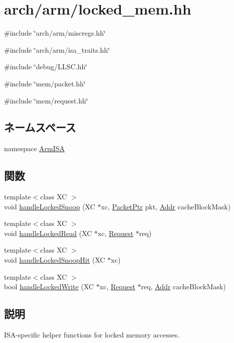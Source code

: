 \hypertarget{arm_2locked__mem_8hh}{
\section{arch/arm/locked\_\-mem.hh}
\label{arm_2locked__mem_8hh}
}
{\ttfamily \#include \char`\"{}arch/arm/miscregs.hh\char`\"{}}\par
{\ttfamily \#include \char`\"{}arch/arm/isa\_\-traits.hh\char`\"{}}\par
{\ttfamily \#include \char`\"{}debug/LLSC.hh\char`\"{}}\par
{\ttfamily \#include \char`\"{}mem/packet.hh\char`\"{}}\par
{\ttfamily \#include \char`\"{}mem/request.hh\char`\"{}}\par
\subsection*{ネームスペース}
\begin{DoxyCompactItemize}
\item 
namespace \hyperlink{namespaceArmISA}{ArmISA}
\end{DoxyCompactItemize}
\subsection*{関数}
\begin{DoxyCompactItemize}
\item 
{\footnotesize template$<$class XC $>$ }\\void \hyperlink{namespaceArmISA_a8ff51dd8329a9d73fa3f696ba2459b53}{handleLockedSnoop} (XC $\ast$xc, \hyperlink{classPacket}{PacketPtr} pkt, \hyperlink{classm5_1_1params_1_1Addr}{Addr} cacheBlockMask)
\item 
{\footnotesize template$<$class XC $>$ }\\void \hyperlink{namespaceArmISA_a366732c079bc222778d2dd75d28e0c37}{handleLockedRead} (XC $\ast$xc, \hyperlink{classRequest}{Request} $\ast$req)
\item 
{\footnotesize template$<$class XC $>$ }\\void \hyperlink{namespaceArmISA_a87d0d22ac86177c45484fa875900fa32}{handleLockedSnoopHit} (XC $\ast$xc)
\item 
{\footnotesize template$<$class XC $>$ }\\bool \hyperlink{namespaceArmISA_aca61775d408552ba4837ee45f484dd39}{handleLockedWrite} (XC $\ast$xc, \hyperlink{classRequest}{Request} $\ast$req, \hyperlink{classm5_1_1params_1_1Addr}{Addr} cacheBlockMask)
\end{DoxyCompactItemize}


\subsection{説明}
ISA-\/specific helper functions for locked memory accesses. 